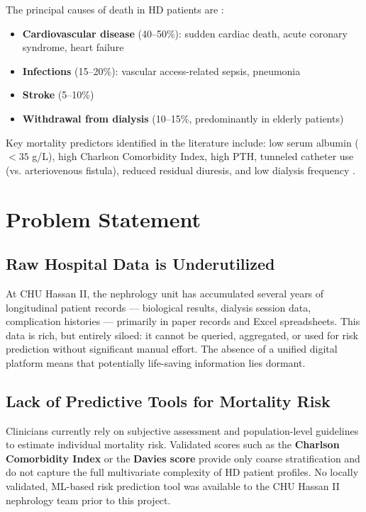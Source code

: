 \documentclass[12pt,a4paper,twoside]{report}
\begin{document}
The principal causes of death in HD patients are \cite{registre_rein_2022}:
\begin{itemize}
  \item \textbf{Cardiovascular disease} (40--50\%): sudden cardiac death, acute coronary syndrome, heart failure
  \item \textbf{Infections} (15--20\%): vascular access-related sepsis, pneumonia
  \item \textbf{Stroke} (5--10\%)
  \item \textbf{Withdrawal from dialysis} (10--15\%, predominantly in elderly patients)
\end{itemize}

Key mortality predictors identified in the literature include: low serum albumin ($<35$ g/L), high Charlson Comorbidity Index, high PTH, tunneled catheter use (vs. arteriovenous fistula), reduced residual diuresis, and low dialysis frequency \cite{kdigo2015, registre_rein_2022}.

\section{Problem Statement}\label{sec:problem}

\subsection{Raw Hospital Data is Underutilized}

At CHU Hassan II, the nephrology unit has accumulated several years of longitudinal patient records — biological results, dialysis session data, complication histories — primarily in paper records and Excel spreadsheets. This data is rich, but entirely siloed: it cannot be queried, aggregated, or used for risk prediction without significant manual effort. The absence of a unified digital platform means that potentially life-saving information lies dormant.

\subsection{Lack of Predictive Tools for Mortality Risk}

Clinicians currently rely on subjective assessment and population-level guidelines to estimate individual mortality risk. Validated scores such as the \textbf{Charlson Comorbidity Index} or the \textbf{Davies score} provide only coarse stratification and do not capture the full multivariate complexity of HD patient profiles. No locally validated, ML-based risk prediction tool was available to the CHU Hassan II nephrology team prior to this project.
\end{document}
